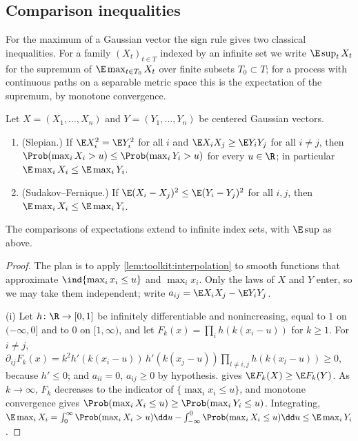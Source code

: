 \begin{refsection}
\section{Comparison inequalities}\label{sec:toolkit:comparison}

For the maximum of a Gaussian vector the sign rule gives two classical inequalities. For a family $(X_t)_{t\in T}$ indexed by an infinite set we write $\E\sup_tX_t$ for the supremum of $\E\max_{t\in T_0}X_t$ over finite subsets $T_0\subset T$; for a process with continuous paths on a separable metric space this is the expectation of the supremum, by monotone convergence.

\begin{theorem}\label{thm:toolkit:slepian}
Let $X=(X_1,\dots,X_n)$ and $Y=(Y_1,\dots,Y_n)$ be centered Gaussian vectors.
\begin{enumerate}
\item (Slepian.) If $\E X_i^2=\E Y_i^2$ for all $i$ and $\E X_iX_j\ge\E Y_iY_j$ for all $i\ne j$, then $\Prob(\max_iX_i>u)\le\Prob(\max_iY_i>u)$ for every $u\in\R$; in particular $\E\max_iX_i\le\E\max_iY_i$.
\item (Sudakov--Fernique.) If $\E(X_i-X_j)^2\le\E(Y_i-Y_j)^2$ for all $i,j$, then $\E\max_iX_i\le\E\max_iY_i$.
\end{enumerate}
The comparisons of expectations extend to infinite index sets, with $\E\sup$ as above.
\end{theorem}

\begin{proof}
The plan is to apply \cref{lem:toolkit:interpolation} to smooth functions that approximate $\ind\{\max_ix_i\le u\}$ and $\max_ix_i$. Only the laws of $X$ and $Y$ enter, so we may take them independent; write $a_{ij}=\E X_iX_j-\E Y_iY_j$.

(i) Let $h\colon\R\to[0,1]$ be infinitely differentiable and nonincreasing, equal to $1$ on $(-\infty,0]$ and to $0$ on $[1,\infty)$, and let $F_k(x)=\prod_ih(k(x_i-u))$ for $k\ge1$. For $i\ne j$, $\partial_{ij}F_k(x)=k^2h'(k(x_i-u))\,h'(k(x_j-u))\prod_{l\ne i,j}h(k(x_l-u))\ge0$, because $h'\le0$; and $a_{ii}=0$, $a_{ij}\ge0$ by hypothesis.  gives $\E F_k(X)\ge\E F_k(Y)$. As $k\to\infty$, $F_k$ decreases to the indicator of $\{\max_ix_i\le u\}$, and monotone convergence gives $\Prob(\max_iX_i\le u)\ge\Prob(\max_iY_i\le u)$. Integrating, $\E\max_iX_i=\int_0^\infty\Prob(\max_iX_i>u)\dd u-\int_{-\infty}^0\Prob(\max_iX_i\le u)\dd u\le\E\max_iY_i$.


\end{proof}
\end{refsection}
